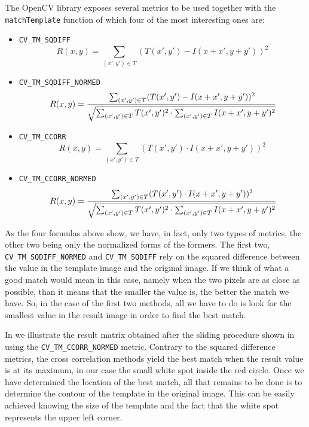 The OpenCV library exposes several metrics to be used together with the
\texttt{matchTemplate} function of which four of the most interesting ones are:
\begin{itemize}
  \item \texttt{CV_TM_SQDIFF}
    \[R(x, y) = \sum_{(x', y') \in T} (T(x', y') - I(x + x', y + y'))^2 \]
  \item \texttt{CV_TM_SQDIFF_NORMED}
    \[R(x, y) = \cfrac{\sum_{(x', y') \in T} (T(x', y') - I(x + x', y + y'))^2}
                     {\sqrt{\sum_{(x', y') \in T} T(x', y')^2 \cdot
                            \sum_{(x', y') \in T} I(x + x', y + y')^2}} \]
  \item \texttt{CV_TM_CCORR}
    \[R(x, y) = \sum_{(x', y') \in T} (T(x', y') \cdot I(x + x', y + y'))^2 \]
  \item \texttt{CV_TM_CCORR_NORMED}
    \[R(x, y) = \cfrac{\sum_{(x', y') \in T} (T(x', y') \cdot I(x + x', y + y'))^2}
                      {\sqrt{\sum_{(x', y') \in T} T(x', y')^2 \cdot
                             \sum_{(x', y') \in T} I(x + x', y + y')^2}} \]
\end{itemize}

As the four formulas above show, we have, in fact, only two types of metrics,
the other two being only the normalized forms of the formers. The first two,
\texttt{CV_TM_SQDIFF_NORMED} and \texttt{CV_TM_SQDIFF} rely on the squared
difference between the value in the template image and the original image. If
we think of what a good match would mean in this case, namely when the two
pixels are as close as possible, than it means that the smaller the value is,
the better the match we have. So, in the case of the first two methods, all we
have to do is look for the smallest value in the result image in order to
find the best match.


In  we illustrate the result matrix
obtained after the sliding procedure shown in
 using the
\texttt{CV_TM_CCORR_NORMED} metric. Contrary to the squared difference
metrics, the cross correlation methods yield the best match when the result
value is at its maximum, in our case the small white spot inside the red
circle. Once we have determined the location of the best match, all that
remains to be done is to determine the contour of the template in the original
image. This can be easily achieved knowing the size of the template and the
fact that the white spot represents the upper left corner.


